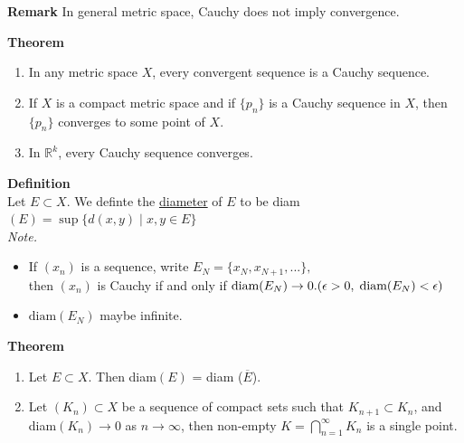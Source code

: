 \documentclass[12pt]{article}
\begin{document}
{\bf Remark} In general metric space, Cauchy does not imply convergence.

\vspace{1\baselineskip}
{\bf Theorem}
\begin{enumerate}[label=(\roman*)]
    \item In any metric space $X$, every convergent sequence is a Cauchy sequence.
    \item If $X$ is a compact metric space and if $\{p_n\}$ is a Cauchy sequence in $X$, then $\{p_n\}$ converges to some point of $X$.
    \item In $\mathbb{R}^k$, every Cauchy sequence converges.
\end{enumerate}

\vspace{1\baselineskip}
{\bf Definition} \\
Let $E\subset X$. We definte the \underline{diameter} of $E$ to be diam$(E) = \sup\{d(x,y)\;|\; x,y\in E\}$\\

{\sl Note.}
\begin{itemize}
    \item If $(x_n)$ is a sequence, write $E_N=\{x_N, x_{N+1},...\},$\\ 
    then $(x_n)$ is Cauchy if and only if $\text{diam}(E_N) \to 0.\hfill (\epsilon>0,\; \text{diam}(E_N) <\epsilon)$
    \item $\text{diam}(E_N)$ maybe infinite.\\
\end{itemize}

{\bf Theorem}
\begin{enumerate}[label=(\roman*)]
    \item Let $E\subset X$. Then diam$(E)$ = diam ($\overline{E}$).
    \item Let $(K_n)\subset X$ be a sequence of compact sets such that $K_{n+1}\subset K_n$, and diam$(K_n)\to 0$ as $n\to \infty$, then non-empty $K= \bigcap\limits_{n=1}^\infty K_n$ is a single point.
\end{enumerate}
\end{document}
